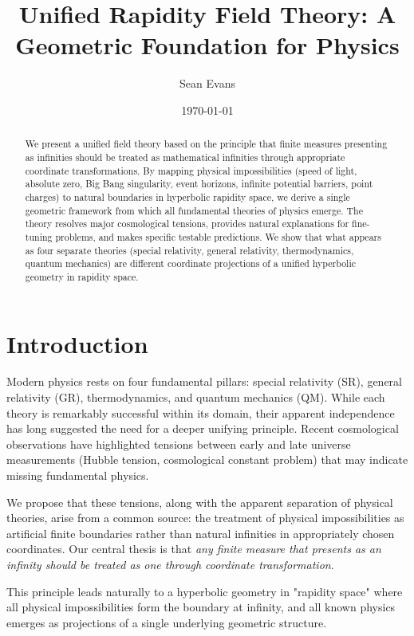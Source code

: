 \documentclass[12pt,a4paper]{article}
\title{Unified Rapidity Field Theory: A Geometric Foundation for Physics}
\author{Sean Evans}
\date{\today}
\begin{document}
\maketitle

\begin{abstract}
We present a unified field theory based on the principle that finite measures presenting as infinities should be treated as mathematical infinities through appropriate coordinate transformations. By mapping physical impossibilities (speed of light, absolute zero, Big Bang singularity, event horizons, infinite potential barriers, point charges) to natural boundaries in hyperbolic rapidity space, we derive a single geometric framework from which all fundamental theories of physics emerge. The theory resolves major cosmological tensions, provides natural explanations for fine-tuning problems, and makes specific testable predictions. We show that what appears as four separate theories (special relativity, general relativity, thermodynamics, quantum mechanics) are different coordinate projections of a unified hyperbolic geometry in rapidity space.
\end{abstract}

\section{Introduction}

Modern physics rests on four fundamental pillars: special relativity (SR), general relativity (GR), thermodynamics, and quantum mechanics (QM). While each theory is remarkably successful within its domain, their apparent independence has long suggested the need for a deeper unifying principle. Recent cosmological observations have highlighted tensions between early and late universe measurements (Hubble tension, cosmological constant problem) that may indicate missing fundamental physics.

We propose that these tensions, along with the apparent separation of physical theories, arise from a common source: the treatment of physical impossibilities as artificial finite boundaries rather than natural infinities in appropriately chosen coordinates. Our central thesis is that \textit{any finite measure that presents as an infinity should be treated as one through coordinate transformation}.

This principle leads naturally to a hyperbolic geometry in "rapidity space" where all physical impossibilities form the boundary at infinity, and all known physics emerges as projections of a single underlying geometric structure.
\end{document}
